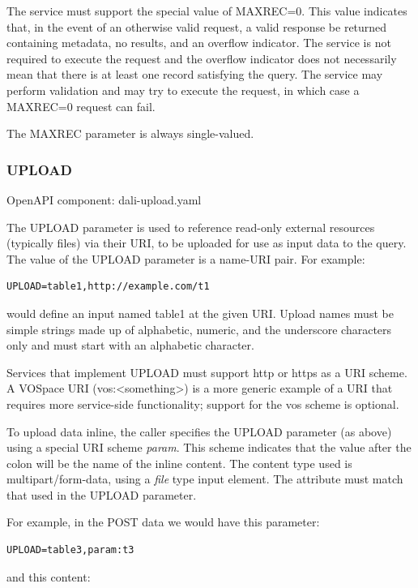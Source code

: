 \documentclass[11pt,letter]{ivoa}
\begin{document}
The service must support the special value of MAXREC=0. This value indicates
that, in the event of an otherwise valid request, a valid response be returned
containing metadata, no results, and an overflow indicator. The
service is not required to execute the request and the overflow indicator does
not necessarily mean that there is at least one record satisfying the query. The
service may perform validation and may try to execute the request, in which case
a MAXREC=0 request can fail.

The MAXREC parameter is always single-valued.

\subsubsection{UPLOAD}
\label{sec:UPLOAD}
OpenAPI component: dali-upload.yaml

The UPLOAD parameter is used to reference read-only external resources
(typically files) via their URI, to be uploaded for use as input data to
the query. The value of the UPLOAD parameter is a name-URI pair. For
example:

\begin{verbatim}
UPLOAD=table1,http://example.com/t1
\end{verbatim}

\noindent
would define an input named table1 at the given URI. Upload names must be
simple strings made up of alphabetic, numeric, and the underscore characters
only and must start with an alphabetic character.

Services that implement UPLOAD must support http or https as a URI scheme.
A VOSpace URI (vos:<something>)  is a
more generic example of a URI that requires more service-side functionality;
support for the vos scheme is optional.

To upload data inline, the caller specifies the UPLOAD parameter (as
above) using a special URI scheme \emph{param}. This scheme indicates that the value
after the colon will be the name of the inline content. The content type used is
multipart/form-data, using a \emph{file} type input element. The  attribute
must match that used in the UPLOAD parameter.

For example, in the POST data we would have this parameter:

\begin{verbatim}
UPLOAD=table3,param:t3
\end{verbatim}

and this content:
\end{document}
